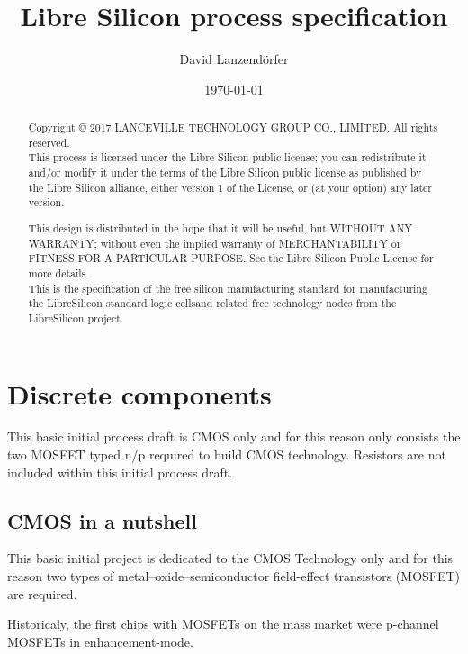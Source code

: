 \documentclass[10pt,a4paper,oneside]{article}
\title{Libre Silicon process specification}
\date{\today}
\author{David Lanzendörfer}
\begin{document}
\maketitle

\begin{abstract}
	Copyright © 2017 LANCEVILLE TECHNOLOGY GROUP CO., LIMITED. All rights reserved. \\

	This process is licensed under the Libre Silicon public license; you can redistribute it and/or modify it under the terms of the Libre Silicon public license
	as published by the Libre Silicon alliance, either version 1 of the License, or (at your option) any later version.

	This design is distributed in the hope that it will be useful, but WITHOUT ANY WARRANTY; without even the implied warranty of MERCHANTABILITY or FITNESS FOR A PARTICULAR PURPOSE.
	See the Libre Silicon Public License for more details. \\

	This is the specification of the free silicon manufacturing standard for manufacturing the LibreSilicon standard logic cells\footnotemark and related free technology nodes from the LibreSilicon project.
\end{abstract}
\newpage
\tableofcontents
\newpage
\section{Discrete components}
This basic initial process draft is CMOS only and for this reason only consists the two MOSFET typed n/p required to build CMOS technology.
Resistors are not included within this initial process draft.

\subsection{CMOS in a nutshell}

This basic initial project is dedicated to the CMOS Technology only and for this reason two types of metal–oxide–semiconductor field-effect transistors (MOSFET) are required.

Historicaly, the first chips with MOSFETs on the mass market were p-channel MOSFETs in enhancement-mode.
\end{document}
